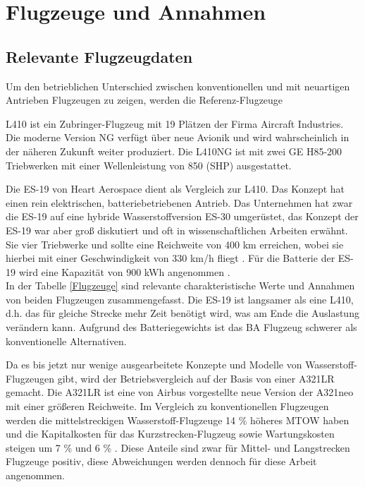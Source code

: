 \section{Flugzeuge und Annahmen}
\subsection{Relevante Flugzeugdaten}
Um den betrieblichen Unterschied zwischen konventionellen und mit neuartigen Antrieben Flugzeugen zu zeigen, werden die Referenz-Flugzeuge %

L410 ist ein Zubringer-Flugzeug mit 19 Plätzen der Firma Aircraft Industries. Die moderne Version NG verfügt über neue Avionik und wird
wahrscheinlich in der näheren Zukunft weiter produziert.
Die L410NG ist mit zwei GE H85-200 Triebwerken mit einer Wellenleistung von 850 (SHP) ausgestattet.


Die ES-19 von Heart Aerospace dient als Vergleich zur L410. Das Konzept hat einen rein elektrischen, batteriebetriebenen Antrieb.
Das Unternehmen hat zwar die ES-19 auf eine hybride Wasserstoffversion ES-30 umgerüstet, das Konzept der ES-19 war aber groß diskutiert 
und oft in wissenschaftlichen Arbeiten erwähnt. Sie vier Triebwerke und sollte eine Reichweite von 400 km erreichen, 
wobei sie hierbei mit einer Geschwindigkeit von 330 km/h fliegt \cite{anker2023feasibility} \cite{heart_aerospace_es19}.
Für die Batterie der ES-19 wird eine Kapazität von 900 kWh angenommen \cite{donckers2024electric}. \\
In der Tabelle \ref{Flugzeuge} sind relevante charakteristische Werte und Annahmen von beiden Flugzeugen zusammengefasst.
Die ES-19 ist langsamer als eine L410, d.h. das für gleiche Strecke mehr Zeit benötigt wird, was am Ende die Auslastung verändern kann.
Aufgrund des Batteriegewichts ist das BA Flugzeug schwerer als konventionelle Alternativen.

Da es bis jetzt nur wenige ausgearbeitete Konzepte und Modelle von Wasserstoff-Flugzeugen gibt, wird der Betriebsvergleich
auf der Basis von einer A321LR gemacht.
Die A321LR ist eine von Airbus vorgestellte neue Version der A321neo mit einer größeren Reichweite.
Im Vergleich zu konventionellen Flugzeugen werden die mittelstreckigen Wasserstoff-Flugzeuge 14 \% höheres MTOW haben 
und die Kapitalkosten für das Kurzstrecken-Flugzeug sowie Wartungskosten steigen um 7 \% und 6 \% \cite{sky2020hydrogen}. 
Diese Anteile sind zwar für Mittel- und Langstrecken Flugzeuge positiv, diese Abweichungen werden dennoch für diese Arbeit angenommen.


